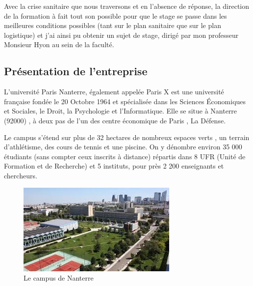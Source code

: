 \documentclass[a4paper, 12pt, twoside]{article}
\begin{document}
Avec la crise sanitaire que nous traversons et en l'absence de réponse, la direction de la formation à fait tout son possible pour que le stage se passe dans les meilleures conditions possibles (tant sur le plan sanitaire que sur le plan logistique) et j'ai ainsi  pu obtenir un sujet de stage, dirigé par mon professeur \textsf{Monsieur Hyon} au sein de la faculté.
\subsection{Présentation de l'entreprise}
L'université Paris Nanterre, également appelée \textsf{Paris X} est une université française fondée le 20 Octobre 1964 et spécialisée dans les Sciences Économiques et Sociales, le Droit, la Psychologie et l'Informatique. Elle se situe à Nanterre (92000) , à deux pas de l'un des centre économique de Paris , La Défense.  \newline

Le campus s'étend sur plus de 32 hectares  de nombreux espaces verts , un terrain d'athlétisme, des cours de tennis et une piscine.  On y dénombre environ 35 000 étudiants (sans compter ceux inscrits à distance) répartis dans 8 UFR (Unité de Formation et de Recherche) et 5 instituts, pour près 2 200 enseignants et chercheurs. 
\begin{center}
\begin{figure}[h]
\centering
\includegraphics[scale=1.3]{campus.jpeg}
\caption{Le campus de Nanterre}
\end{figure}
\end{center}
\end{document}
